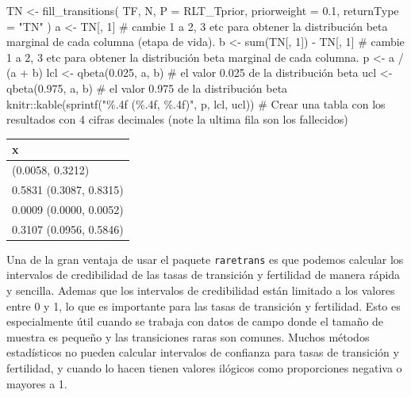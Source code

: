 \documentclass[
  12pt,
  letterpaper,
]{book}
\newenvironment{Shaded}{\begin{snugshade}}{\end{snugshade}}
\newcommand{\AttributeTok}[1]{\textcolor[rgb]{0.40,0.45,0.13}{#1}}
\newcommand{\CommentTok}[1]{\textcolor[rgb]{0.37,0.37,0.37}{#1}}
\newcommand{\DecValTok}[1]{\textcolor[rgb]{0.68,0.00,0.00}{#1}}
\newcommand{\FloatTok}[1]{\textcolor[rgb]{0.68,0.00,0.00}{#1}}
\newcommand{\FunctionTok}[1]{\textcolor[rgb]{0.28,0.35,0.67}{#1}}
\newcommand{\NormalTok}[1]{\textcolor[rgb]{0.00,0.23,0.31}{#1}}
\newcommand{\OtherTok}[1]{\textcolor[rgb]{0.00,0.23,0.31}{#1}}
\newcommand{\SpecialCharTok}[1]{\textcolor[rgb]{0.37,0.37,0.37}{#1}}
\newcommand{\StringTok}[1]{\textcolor[rgb]{0.13,0.47,0.30}{#1}}
\begin{document}
\begin{Shaded}
\begin{Highlighting}[]
\NormalTok{TN }\OtherTok{\textless{}{-}} \FunctionTok{fill\_transitions}\NormalTok{(}
\NormalTok{  TF,}
\NormalTok{  N,}
  \AttributeTok{P =}\NormalTok{ RLT\_Tprior,}
  \AttributeTok{priorweight =} \FloatTok{0.1}\NormalTok{,}
  \AttributeTok{returnType =} \StringTok{"TN"}
\NormalTok{)}
\NormalTok{a }\OtherTok{\textless{}{-}}\NormalTok{ TN[, }\DecValTok{1}\NormalTok{] }\CommentTok{\# cambie 1 a 2, 3 etc para obtener la distribución beta marginal de cada columna (etapa de vida).}
\NormalTok{b }\OtherTok{\textless{}{-}} \FunctionTok{sum}\NormalTok{(TN[, }\DecValTok{1}\NormalTok{]) }\SpecialCharTok{{-}}\NormalTok{ TN[, }\DecValTok{1}\NormalTok{] }\CommentTok{\# cambie 1 a 2, 3 etc para obtener la distribución beta marginal de cada columna.}
\NormalTok{p }\OtherTok{\textless{}{-}}\NormalTok{ a }\SpecialCharTok{/}\NormalTok{ (a }\SpecialCharTok{+}\NormalTok{ b)}
\NormalTok{lcl }\OtherTok{\textless{}{-}} \FunctionTok{qbeta}\NormalTok{(}\FloatTok{0.025}\NormalTok{, a, b) }\CommentTok{\# el valor 0.025 de la distribución beta}
\NormalTok{ucl }\OtherTok{\textless{}{-}} \FunctionTok{qbeta}\NormalTok{(}\FloatTok{0.975}\NormalTok{, a, b) }\CommentTok{\# el valor 0.975 de la distribución beta}
\NormalTok{knitr}\SpecialCharTok{::}\FunctionTok{kable}\NormalTok{(}\FunctionTok{sprintf}\NormalTok{(}\StringTok{"\%.4f (\%.4f, \%.4f)"}\NormalTok{, p, lcl, ucl)) }\CommentTok{\# Crear una tabla con los resultados con 4 cifras decimales (note la ultima fila son los fallecidos)}
\end{Highlighting}
\end{Shaded}

\begin{longtable}[]{@{}l@{}}
\toprule\noalign{}
x \\
\midrule\noalign{}
\endhead
\bottomrule\noalign{}
\endlastfoot
0.1054 (0.0058, 0.3212) \\
0.5831 (0.3087, 0.8315) \\
0.0009 (0.0000, 0.0052) \\
0.3107 (0.0956, 0.5846) \\
\end{longtable}

Una de la gran ventaja de usar el paquete \texttt{raretrans} es que
podemos calcular los intervalos de credibilidad de las tasas de
transición y fertilidad de manera rápida y sencilla. Ademas que los
intervalos de credibilidad están limitado a los valores entre 0 y 1, lo
que es importante para las tasas de transición y fertilidad. Esto es
especialmente útil cuando se trabaja con datos de campo donde el tamaño
de muestra es pequeño y las transiciones raras son comunes. Muchos
métodos estadísticos no pueden calcular intervalos de confianza para
tasas de transición y fertilidad, y cuando lo hacen tienen valores
ilógicos como proporciones negativa o mayores a 1.
\end{document}

